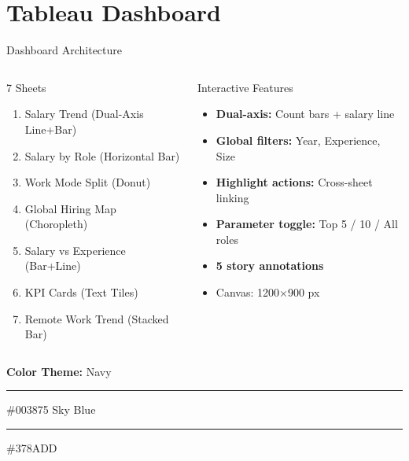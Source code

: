 \documentclass[aspectratio=169]{beamer}
\begin{document}
\section{Tableau Dashboard}

\begin{frame}{Dashboard Architecture}
\begin{columns}
\begin{block}{7 Sheets}
\footnotesize
\begin{enumerate}
    \item Salary Trend (Dual-Axis Line+Bar)
    \item Salary by Role (Horizontal Bar)
    \item Work Mode Split (Donut)
    \item Global Hiring Map (Choropleth)
    \item Salary vs Experience (Bar+Line)
    \item KPI Cards (Text Tiles)
    \item Remote Work Trend (Stacked Bar)
\end{enumerate}
\end{block}
\begin{block}{Interactive Features}
\footnotesize
\begin{itemize}
    \item \textbf{Dual-axis:} Count bars + salary line
    \item \textbf{Global filters:} Year, Experience, Size
    \item \textbf{Highlight actions:} Cross-sheet linking
    \item \textbf{Parameter toggle:} Top 5 / 10 / All roles
    \item \textbf{5 story annotations}
    \item Canvas: 1200$\times$900 px
\end{itemize}
\end{block}
\end{columns}
\vspace{0.2cm}
\centering
\footnotesize\textbf{Color Theme:} Navy \textcolor{navy}{\rule{0.8cm}{0.3cm}} \#003875 \quad Sky Blue \textcolor{skyblue}{\rule{0.8cm}{0.3cm}} \#378ADD
\end{frame}
\end{document}
